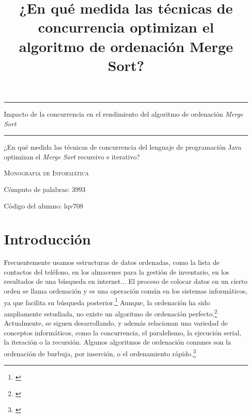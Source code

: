 \documentclass[titlepage]{article}
\title{¿En qué medida las técnicas de concurrencia optimizan el algoritmo de ordenación Merge Sort?}
\begin{document}
	
	
\begin{titlepage}
	\centering
	\hfill
	\vspace{3cm}
	
	\hrule
	\vspace{1cm}
	\onehalfspacing
	{\Huge Impacto de la concurrencia en el rendimiento del algoritmo de ordenación \textit{Merge Sort}\par}
	\vspace{1cm}
	\hrule
	
	\vspace{1cm}
	{\LARGE ¿En qué medida las técnicas de concurrencia del lenguaje de programación Java optimizan el \textit{Merge Sort} recursivo e iterativo? \par}
	
	\vspace{1cm}
	
	{\scshape\large Monografia de Informática\par}
	
	\vspace{8cm}
	
	{\large Cómputo de palabras: 3993\par}
	{\large Código del alumno: lqv708 \par}
	
	
\end{titlepage}

\newpage
\tableofcontents

\newpage
\section{Introducción} %
Frecuentemente usamos estructuras de datos ordenadas, como la lista de contactos del teléfono, en los almacenes para la gestión de inventario, en los resultados de una búsqueda en internet... El proceso de colocar datos en un cierto orden se llama ordenación y es una operación común en los sistemas informáticos, ya que facilita su búsqueda posterior.\footnote{\cite{knuth-1997}} Aunque, la ordenación ha sido ampliamente estudiada, no existe un algoritmo de ordenación perfecto.\footnote{\cite{McMillan-2007}} Actualmente, se siguen desarrollando, y además relacionan una variedad de conceptos informáticos, como la concurrencia, el paralelismo, la ejecución serial, la iteración o la recursión. Algunos algoritmos de ordenación comunes son la ordenación de burbuja, por inserción, o el ordenamiento rápido.\footnote{\cite{pandey-2008}}
\end{document}
